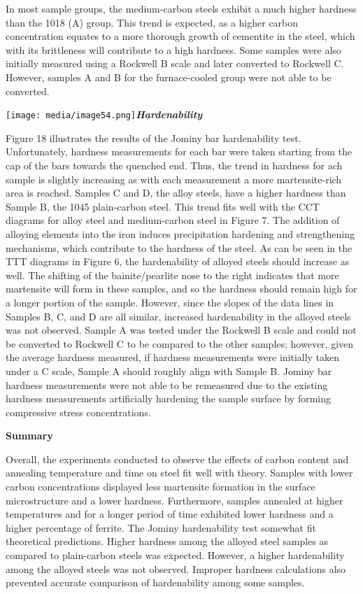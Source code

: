\documentclass[]{article}
\begin{document}
In most sample groups, the medium-carbon steels exhibit a much higher
hardness than the 1018 (A) group. This trend is expected, as a higher
carbon concentration equates to a more thorough growth of cementite in
the steel, which with its brittleness will contribute to a high
hardness. Some samples were also initially measured using a Rockwell B
scale and later converted to Rockwell C. However, samples A and B for
the furnace-cooled group were not able to be converted.

\texttt{[image: media/image54.png]}\emph{\textbf{Hardenability}}

Figure 18 illustrates the results of the Jominy bar hardenability test.
Unfortunately, hardness measurements for each bar were taken starting
from the cap of the bars towards the quenched end. Thus, the trend in
hardness for ach sample is slightly increasing as with each measurement
a more martensite-rich area is reached. Samples C and D, the alloy
steels, have a higher hardness than Sample B, the 1045 plain-carbon
steel. This trend fits well with the CCT diagrams for alloy steel and
medium-carbon steel in Figure 7. The addition of alloying elements into
the iron induces precipitation hardening and strengthening mechanisms,
which contribute to the hardness of the steel. As can be seen in the TTT
diagrams in Figure 6, the hardenability of alloyed steels should
increase as well. The shifting of the bainite/pearlite nose to the right
indicates that more martensite will form in these samples, and so the
hardness should remain high for a longer portion of the sample. However,
since the slopes of the data lines in Samples B, C, and D are all
similar, increased hardenability in the alloyed steels was not observed.
Sample A was tested under the Rockwell B scale and could not be
converted to Rockwell C to be compared to the other samples; however,
given the average hardness measured, if hardness measurements were
initially taken under a C scale, Sample A should roughly align with
Sample B. Jominy bar hardness measurements were not able to be
remeasured due to the existing hardness measurements artificially
hardening the sample surface by forming compressive stress
concentrations.

\textbf{Summary}

Overall, the experiments conducted to observe the effects of carbon
content and annealing temperature and time on steel fit well with
theory. Samples with lower carbon concentrations displayed less
martensite formation in the surface microstructure and a lower hardness.
Furthermore, samples annealed at higher temperatures and for a longer
period of time exhibited lower hardness and a higher percentage of
ferrite. The Jominy hardenability test somewhat fit theoretical
predictions. Higher hardness among the alloyed steel samples as compared
to plain-carbon steels was expected. However, a higher hardenability
among the alloyed steels was not observed. Improper hardness
calculations also prevented accurate comparison of hardenability among
some samples.
\end{document}
